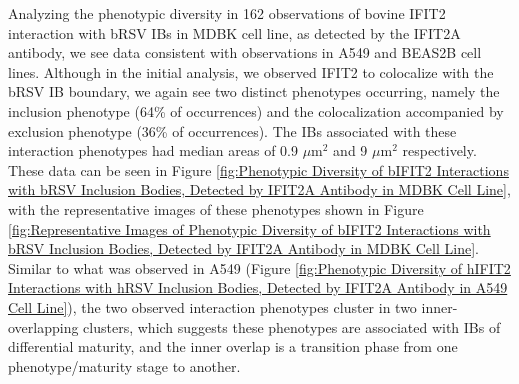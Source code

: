 Analyzing the phenotypic diversity in 162 observations of bovine IFIT2 interaction with bRSV IBs in MDBK cell line, as detected by the IFIT2A antibody, we see data consistent with observations in A549 and BEAS2B cell lines. Although in the initial analysis, we observed IFIT2 to colocalize with the bRSV IB boundary, we again see two distinct phenotypes occurring, namely the inclusion phenotype (64\% of occurrences) and the colocalization accompanied by exclusion phenotype (36\% of occurrences). The IBs associated with these interaction phenotypes had median areas of 0.9 \(\mu \mbox{m}^2\) and 9 \(\mu \mbox{m}^2\) respectively. These data can be seen in Figure \ref{fig:Phenotypic Diversity of bIFIT2 Interactions with bRSV Inclusion Bodies, Detected by IFIT2A Antibody in MDBK Cell Line}, with the representative images of these phenotypes shown in Figure \ref{fig:Representative Images of Phenotypic Diversity of bIFIT2 Interactions with bRSV Inclusion Bodies, Detected by IFIT2A Antibody in MDBK Cell Line}. Similar to what was observed in A549 (Figure \ref{fig:Phenotypic Diversity of hIFIT2 Interactions with hRSV Inclusion Bodies, Detected by IFIT2A Antibody in A549 Cell Line}), the two observed interaction phenotypes cluster in two inner-overlapping clusters, which suggests these phenotypes are associated with IBs of differential maturity, and the inner overlap is a transition phase from one phenotype/maturity stage to another.

